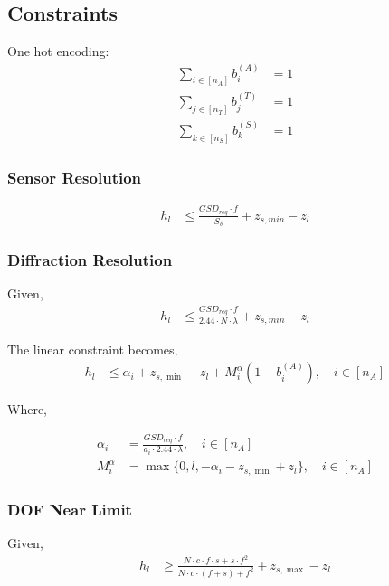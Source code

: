 \documentclass[11pt]{article}
\begin{document}
\subsection{Constraints}

\noindent
One hot encoding:
\begin{align}
  \sum_{i \in [n_A]} b_i^{(A)} &=1\\
  \sum_{j \in [n_T]} b_j^{(T)} &=1\\
  \sum_{k \in [n_S]} b_k^{(S)} &=1
\end{align}

\subsubsection{Sensor Resolution}

\begin{align}
  h_l &\leq \frac{GSD_{req} \cdot f }{S_\delta} + z_{s,min} - z_l
\end{align}

\subsubsection{Diffraction Resolution}
Given,
\begin{align}
  h_l &\leq \frac{GSD_{req} \cdot f}{2.44 \cdot N \cdot \lambda} + z_{s,min} - z_l
\end{align}

\noindent
The linear constraint becomes,
\begin{align}
  h_l &\leq \alpha_i +z_{s,\min} - z_l + M_i^\alpha(1-b_i^{(A)}), \quad i \in [n_A]
\end{align}

\noindent
Where, 

\begin{align}
  \alpha_i &= \frac{GSD_{req} \cdot f}{a_i \cdot 2.44 \cdot \lambda}, \quad i \in [n_A]\\
  M_i^\alpha &= \max\{0, l, - \alpha_i - z_{s,\min} + z_l\}, \quad i \in [n_A]
\end{align}


\subsubsection{DOF Near Limit}
Given,
\begin{align}
  h_l &\geq \frac{N \cdot c \cdot f \cdot s + s \cdot f^2}{N \cdot c \cdot (f+s) + f^2} + z_{s,\max} - z_l 
\end{align}
\end{document}
